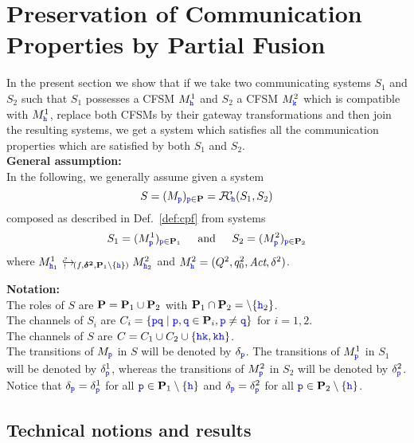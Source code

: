 


\section{Preservation of Communication Properties by Partial Fusion}
\label{sect:safetypreservation}


In the present section we show that if we take two communicating systems
$S_1$ and $S_2$ such that $S_1$ possesses a CFSM $M^1_\HH$ and $S_2$ a CFSM $M^2_\KK$ which is compatible with $M^1_\HH$, replace both CFSMs by their gateway transformations and then join the resulting systems, we get a system which satisfies all the communication properties which are satisfied by both $S_1$ and $S_2$.\\


\noindent
\textbf{General assumption:}\\ 
In the following, we generally assume given a
system  
$$S= (M_\ttp)_{\ttp\in\roles} = \fusioncomp_{\!\hh}(S_1,S_2)$$  
composed
as described in Def.~\ref{def:cpf}
from systems 
$$S_1= (M^1_\ttp)_{\ttp\in\roles_1}  \hspace{4mm} \text{ and } \hspace{4mm} S_2= (M^2_\ttp)_{\ttp\in\roles_2}$$ where $\emb{f}{\bm{\delta^2}}{\roles_1\setminus\Set{\hh}}{M^1_{\hh_1}}{M^2_{\hh_2}}$
and $M^2_\hh = (Q^2, q^2_0, \textit{Act}, \delta^2)$.



\vspace{2mm}
\noindent
\textbf{Notation:} \\
The roles of $S$ are $\roles=\roles_1\cup\roles_2$ with  $\roles_1\cap\roles_2=\setminus\Set{\hh_2}$.\\
The channels of $S_i$ are  $C_i=\Set{\ttp\ttq \mid \ttp,\ttq\in \roles_i, \ttp\neq\ttq}$ for $i=1,2$.\\
The channels of $S$ are 
$C=C_1\cup C_2\cup\Set{\HH\KK,\KK\HH}$.\\
The transitions of $M_\ttp$ in $S$ will be denoted by $\delta_\ttp$.
The transitions of $M^1_\ttp$ in $S_1$ will be denoted by $\delta^1_\ttp$, whereas the 
transitions of $M^2_\ttp$ in $S_2$ will be denoted by $\delta^2_\ttp$.
Notice that $\delta_\ttp = \delta^1_\ttp$ for all $\ttp\in\roles_1\setminus\Set{\HH}$
and $\delta_\ttp = \delta^2_\ttp$ for all $\ttp\in\roles_2\setminus\Set{\hh}$.



\subsection{Technical notions and results}

